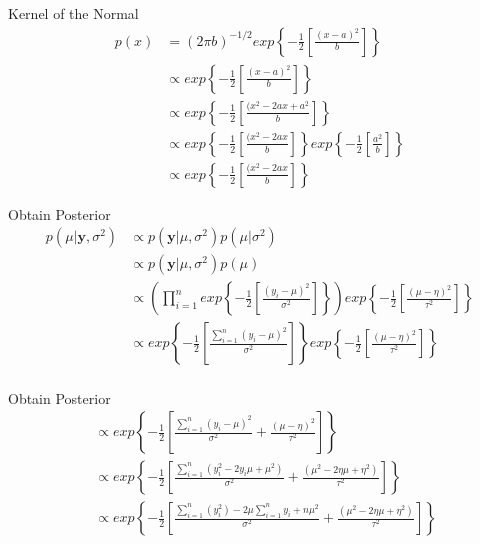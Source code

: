 \documentclass[10pt]{beamer}
\begin{document}
\begin{frame}{Kernel of the Normal}
  \begin{align*}
    p(x)&=(2\pi b)^{-1/2}exp\left\{-\frac{1}{2}\left[\frac{(x-a)^2}{b}\right]\right\}\\
        &\propto exp\left\{-\frac{1}{2}\left[\frac{(x-a)^2}{b}\right]\right\}\\
        &\propto exp\left\{-\frac{1}{2}\left[\frac{(x^2-2ax+a^2}{b}\right]\right\}\\
        &\propto exp\left\{-\frac{1}{2}\left[\frac{(x^2-2ax}{b}\right]\right\}
          exp\left\{-\frac{1}{2}\left[\frac{a^2}{b}\right]\right\}\\
        &\propto exp\left\{-\frac{1}{2}\left[\frac{(x^2-2ax}{b}\right]\right\}
  \end{align*}
\end{frame}
\begin{frame}{Obtain Posterior}
  \begin{align*}
    p(\mu|{\bm y},\sigma^2) &\propto p({\bm y}|\mu,\sigma^2)p(\mu|\sigma^2)\\
                            &\propto p({\bm y}|\mu,\sigma^2)p(\mu)\\
                            &\propto \left(\prod\limits_{i=1}^nexp\left\{-\frac{1}{2}\left[\frac{\left(y_i-\mu\right)^2}{\sigma^2}\right]\right\}\right)
                              exp\left\{-\frac{1}{2}\left[\frac{\left(\mu-\eta\right)^2}{\tau^2}\right]\right\}\\
                            &\propto exp\left\{-\frac{1}{2}\left[\frac{\sum\limits_{i=1}^n\left(y_i-\mu\right)^2}{\sigma^2}\right]\right\}exp\left\{-\frac{1}{2}\left[\frac{\left(\mu-\eta\right)^2}{\tau^2}\right]\right\}\\
  \end{align*}
\end{frame}
\begin{frame}{Obtain Posterior}
  \begin{align*}
    &\propto exp\left\{-\frac{1}{2}\left[\frac{\sum\limits_{i=1}^n\left(y_i-\mu\right)^2}{\sigma^2}+\frac{\left(\mu-\eta\right)^2}{\tau^2}\right]\right\}\\
    &\propto exp\left\{-\frac{1}{2}\left[\frac{\sum\limits_{i=1}^n\left(y^2_i-2y_i\mu+\mu^2\right)}{\sigma^2}+\frac{\left(\mu^2-2\eta\mu+\eta^2\right)}{\tau^2}\right]\right\}\\
    &\propto exp\left\{-\frac{1}{2}\left[\frac{\sum\limits_{i=1}^n(y_i^2)-2\mu\sum\limits_{i=1}^n y_i+n\mu^2}{\sigma^2}+\frac{\left(\mu^2-2\eta\mu+\eta^2\right)}{\tau^2}\right]\right\}\\
  \end{align*}
\end{frame}
\end{document}
